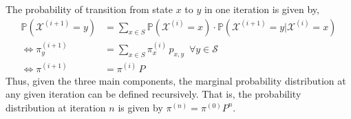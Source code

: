 The probability of transition from state $x$ to $y$ in one iteration is given by,
\begin{equation}
	\begin{split}
		\mathbb{P}(\mathcal{X}^{(i+1)} = y) & = \sum_{x \in S} \mathbb{P}(\mathcal{X}^{(i)} = x) \cdot \mathbb{P}(\mathcal{X}^{(i+1)} = y | \mathcal{X}^{(i)} = x) \\
		\Leftrightarrow \pi^{(i+1)}_y  & = \sum_{x \in S} \pi_x^{(i)} \, p_{x,y}  \,\,\, \forall y \in \mathcal{S} \\
		\Leftrightarrow \pi^{(i+1)}    & = \pi^{(i)} \, P
	\end{split}
\label{eq:app_markov_chain_one_iteration}
\end{equation}
Thus, given the three main components, the marginal probability distribution at any given iteration can be defined recursively.
That is, the probability distribution at iteration $n$ is given by $\pi^{(n)} = \pi^{(0)} P^n$.

